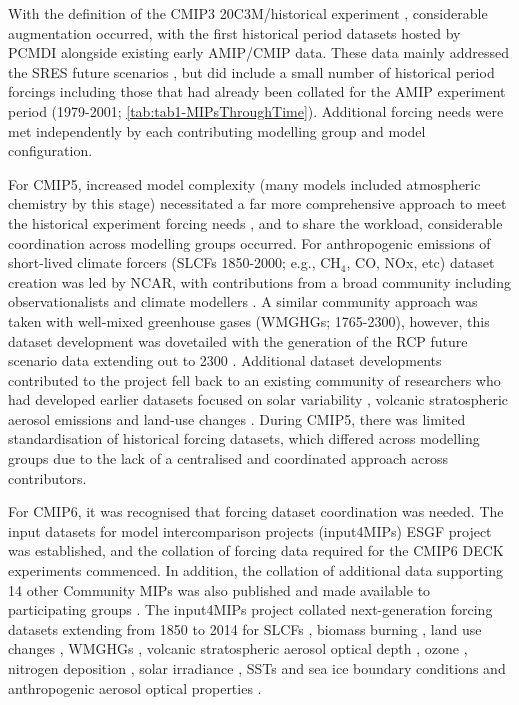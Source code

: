 \documentclass[gmd, preprint]{copernicus}
\begin{document}
With the definition of the CMIP3 20C3M/historical experiment \citep[$\sim$1850-2000;][]{meehl_wcrp_2007}, considerable augmentation occurred, with the first historical period datasets hosted by PCMDI alongside existing early AMIP/CMIP data. These data mainly addressed the SRES future scenarios \citep[2001-2100/2200/2300;][]{nakicenovic_summary_2000}, but did include a small number of historical period forcings including those that had already been collated for the AMIP experiment period (1979-2001; \autoref{tab:tab1-MIPsThroughTime}). Additional forcing needs were met independently by each contributing modelling group and model configuration.

For CMIP5, increased model complexity (many models included atmospheric chemistry by this stage) necessitated a far more comprehensive approach to meet the historical experiment forcing needs \citep[1850-2005;][]{taylor_overview_2012}, and to share the workload, considerable coordination across modelling groups occurred. For anthropogenic emissions of short-lived climate forcers (SLCFs 1850-2000; e.g., CH$_{4}$, CO, NOx, etc) dataset creation was led by NCAR, with contributions from a broad community including observationalists and climate modellers \citep{lamarque_historical_2010}. A similar community approach was taken with well-mixed greenhouse gases (WMGHGs; 1765-2300), however, this dataset development was dovetailed with the generation of the RCP future scenario data extending out to 2300 \citep{meinshausen_rcp_2011}. Additional dataset developments contributed to the project fell back to an existing community of researchers who had developed earlier datasets focused on solar variability \citep{frohlich_solar_2004}, volcanic stratospheric aerosol emissions \citep{stenchikov_arctic_2006} and land-use changes \citep{hurtt_underpinnings_2006}. During CMIP5, there was limited standardisation of historical forcing datasets, which differed across modelling groups due to the lack of a centralised and coordinated approach across contributors.

For CMIP6, it was recognised that forcing dataset coordination was needed. The input datasets for model intercomparison projects (input4MIPs) ESGF project was established, and the collation of forcing data required for the CMIP6 DECK experiments commenced. In addition, the collation of additional data supporting 14 other Community MIPs was also published and made available to participating groups \citep{durack_toward_2018}. The input4MIPs project collated next-generation forcing datasets extending from 1850 to 2014 for SLCFs \citep{hoesly_historical_2018,feng_generation_2020}, biomass burning \citep[e.g., fire;][]{van_marle_historic_2017}, land use changes \citep{hurtt_harmonization_2020,chini_land-use_2021}, WMGHGs \citep{meinshausen_historical_2017}, volcanic stratospheric aerosol optical depth \citep[e.g.,][]{aubry_new_2020,aubry_independent_2021,aubry_new_2023}, ozone \citep{checa-garcia_historical_2018}, nitrogen deposition \citep{hegglin_ccmi_2016}, solar irradiance \citep{matthes_solar_2017}, SSTs and sea ice boundary conditions \citep{durack_pcmdi_2018} and anthropogenic aerosol optical properties \citep[e.g.,][]{fiedler_anthropogenic_2019}.
\end{document}
